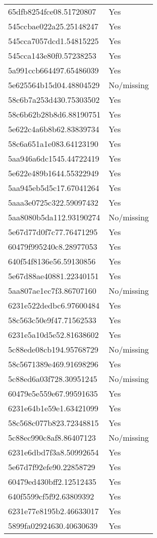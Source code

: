 \begin{tabular}{ll}
65dfb8254fce08.51720807 & Yes \\
545ccbae022a25.25148247 & Yes \\
545cca7057dcd1.54815225 & Yes \\
545cca143e80f0.57238253 & Yes \\
5a991ccb664497.65486039 & Yes \\
5e625564b15d04.48804529 & No/missing \\
58c6b7a253d430.75303502 & Yes \\
58c6b62b28b8d6.88190751 & Yes \\
5e622c4a6b8b62.83839734 & Yes \\
58c6a651a1e083.64123190 & Yes \\
5aa946a6dc1545.44722419 & Yes \\
5e622e489b1644.55322949 & Yes \\
5aa945eb5d5c17.67041264 & Yes \\
5aaa3e0725c322.59097432 & Yes \\
5aa8080b5da112.93190274 & No/missing \\
5e67d77d0f7c77.76471295 & Yes \\
60479f995240c8.28977053 & Yes \\
640f54f8136e56.59130856 & Yes \\
5e67d88ae40881.22340151 & Yes \\
5aa807ae1ec7f3.86707160 & No/missing \\
6231e522dedbc6.97600484 & Yes \\
58c563c50e9f47.71562533 & Yes \\
6231e5a10d5e52.81638602 & Yes \\
5c88ede08cb194.95768729 & No/missing \\
58c5671389e469.91698296 & Yes \\
5c88ed6a03f728.30951245 & No/missing \\
60479e5e559e67.99591635 & Yes \\
6231e64b1e59e1.63421099 & Yes \\
58c568c077b823.72348815 & Yes \\
5c88ec990c8af8.86407123 & No/missing \\
6231e6dbd7f3a8.50992654 & Yes \\
5e67d7f92efe90.22858729 & Yes \\
60479ed430bff2.12512435 & Yes \\
640f5599cf5f92.63809392 & Yes \\
6231e77e8195b2.46633017 & Yes \\
5899fa02924630.40630639 & Yes \\

\end{tabular}
